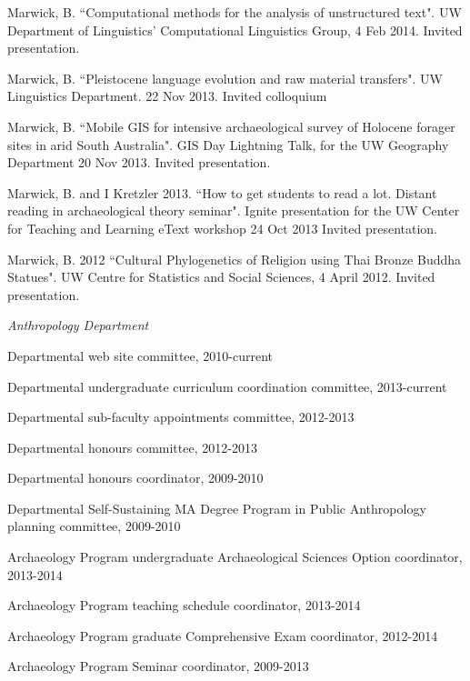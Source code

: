 \documentclass[11pt,article,oneside]{memoir}
\begin{document}
\medskip

\ind Marwick, B. ``Computational methods for the analysis of unstructured text". UW Department of Linguistics’  Computational Linguistics Group, 4 Feb 2014. Invited presentation.

\ind Marwick, B. ``Pleistocene language evolution and raw material transfers". UW Linguistics Department. 22 Nov 2013. Invited colloquium

\ind Marwick, B. ``Mobile GIS for intensive archaeological survey of Holocene forager sites in arid South Australia". GIS Day Lightning Talk,  for the UW Geography Department 20 Nov 2013. Invited presentation.

\ind Marwick, B. and I Kretzler 2013. ``How to get students to read a lot. Distant reading in archaeological theory seminar". Ignite presentation for the UW Center for Teaching and Learning eText workshop 24 Oct 2013 Invited presentation.

\ind Marwick, B. 2012 ``Cultural Phylogenetics of Religion using Thai Bronze Buddha Statues". UW Centre for Statistics and Social Sciences, 4 April 2012. Invited presentation.

\bigskip



\medskip

\noindent\emph{Anthropology Department \vspace{0.01in}}

\ind Departmental web site committee, 2010-current

\ind Departmental undergraduate curriculum coordination committee, 2013-current

\ind Departmental sub-faculty appointments committee, 2012-2013

\ind Departmental honours committee, 2012-2013

\ind Departmental honours coordinator, 2009-2010

\ind Departmental Self-Sustaining MA Degree Program in Public Anthropology planning committee, 2009-2010

\ind Archaeology Program undergraduate Archaeological Sciences Option coordinator, 2013-2014

\ind Archaeology Program teaching schedule coordinator, 2013-2014

\ind Archaeology Program graduate Comprehensive Exam coordinator, 2012-2014

\ind Archaeology Program Seminar coordinator, 2009-2013
\end{document}
